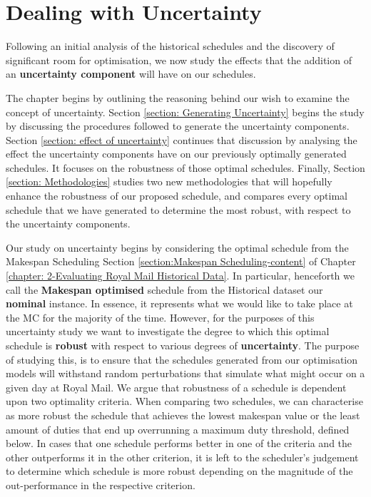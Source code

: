 \chapter{Dealing with Uncertainty} 
\label{chapter:Benchmark Instances}


Following an initial analysis of the historical schedules and the discovery of significant room for optimisation, we now study the effects that the addition of an \textbf{uncertainty component} will have on our schedules.

\vspace{\baselineskip}
\noindent
The chapter begins by outlining the reasoning behind our wish to examine the concept of uncertainty. Section \ref{section: Generating Uncertainty} begins the study by discussing the procedures followed to generate the uncertainty components. Section \ref{section: effect of uncertainty} continues that discussion by analysing the effect the uncertainty components have on our previously optimally generated schedules. It focuses on the robustness of those optimal schedules. Finally, Section \ref{section: Methodologies} studies two new methodologies that will hopefully enhance the robustness of our proposed schedule, and compares every optimal schedule that we have generated to determine the most robust, with respect to the uncertainty components.


\vspace{\baselineskip}
\noindent
 Our study on uncertainty begins by considering the optimal schedule from the Makespan Scheduling Section \ref{section:Makespan Scheduling-content} of Chapter \ref{chapter: 2-Evaluating Royal Mail Historical Data}. In particular, henceforth we call the \textbf{Makespan optimised} schedule from the Historical dataset our \textbf{nominal} instance. In essence, it represents what we would like to take place at the MC for the majority of the time. However, for the purposes of this uncertainty study we want to investigate the degree to which this optimal schedule is \textbf{robust} with respect to various degrees of \textbf{uncertainty}. The purpose of studying this, is to ensure that the schedules generated from our optimisation models will withstand random perturbations that simulate what might occur on a given day at Royal Mail. We argue that robustness of a schedule is dependent upon two optimality criteria. When comparing two schedules, we can characterise as more robust the schedule that achieves the lowest makespan value \cite{DBLP:approximatingbounded} or the least amount of duties that end up overrunning a maximum duty threshold, defined below. In cases that one schedule performs better in one of the criteria and the other outperforms it in the other criterion, it is left to the scheduler's judgement to determine which schedule is more robust depending on the magnitude of the out-performance in the respective criterion.


